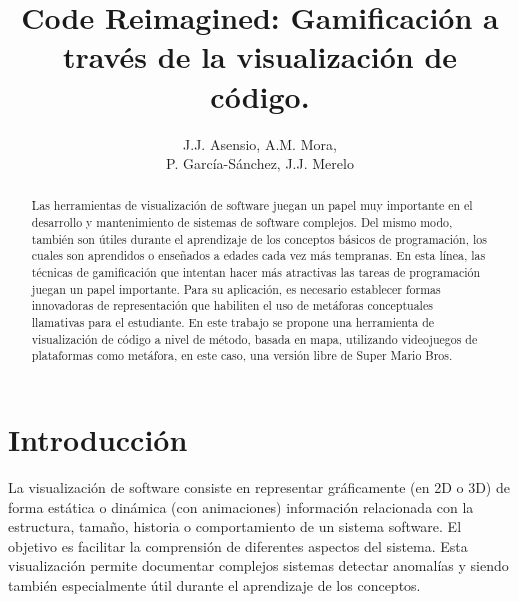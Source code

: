 \documentclass{llncs}
\begin{document}

\title{Code Reimagined: Gamificación a través de la visualización de código.}


\author{J.J. Asensio, A.M. Mora, \\P. García-Sánchez, J.J. Merelo}

\maketitle
%
%
\begin{abstract} 
Las herramientas de visualización de software juegan un papel muy importante en el desarrollo y mantenimiento de sistemas de software complejos. Del mismo modo, también son útiles durante el aprendizaje de los conceptos básicos de programación, los cuales son aprendidos o enseñados a edades cada vez más tempranas. En esta línea, las técnicas de gamificación que intentan hacer más atractivas las tareas de programación juegan un papel importante. Para su aplicación, es necesario establecer formas innovadoras de representación que habiliten el uso de metáforas conceptuales llamativas para el estudiante. En este trabajo se propone una herramienta de visualización de código a nivel de método, basada en mapa, utilizando videojuegos de plataformas como metáfora, en este caso, una versión libre de Super Mario Bros.
\end{abstract}


%
%
\section{Introducción}
\label{sec:intro}
La visualización de software consiste en representar gráficamente (en 2D o 3D) de forma estática o dinámica (con animaciones) información relacionada con la estructura, tamaño, historia o comportamiento de un sistema software. El objetivo es facilitar la comprensión de diferentes aspectos del sistema. Esta visualización permite documentar complejos sistemas detectar anomalías y siendo también especialmente útil durante el aprendizaje de los conceptos. 
\end{document}
